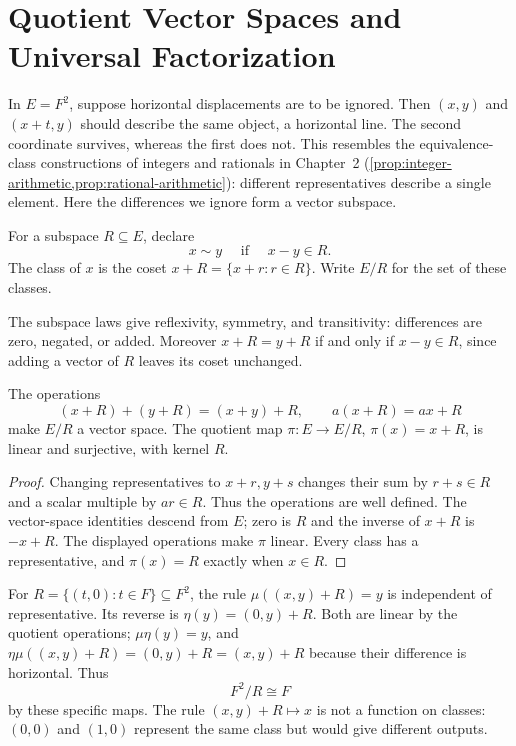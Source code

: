 \section{Quotient Vector Spaces and Universal Factorization}
\label{sec:quotient-vector-spaces}
In $E=F^2$, suppose horizontal displacements are to be ignored. Then
$(x,y)$ and $(x+t,y)$ should describe the same object, a horizontal line.
The second coordinate survives, whereas the first does not. This resembles
the equivalence-class constructions of integers and rationals in Chapter~2 (\cref{prop:integer-arithmetic,prop:rational-arithmetic}):
different representatives describe a single element. Here the differences
we ignore form a vector subspace.
\begin{definition}[Cosets]
For a subspace $R\subseteq E$, declare
\[
x\sim y\quad\text{ if }\quad x-y\in R.
\]
The class of $x$ is the coset $x+R=\{x+r:r\in R\}$. Write $E/R$ for
the set of these classes.
\end{definition}
The subspace laws give reflexivity, symmetry, and transitivity: differences
are zero, negated, or added. Moreover $x+R=y+R$ if and only if $x-y\in R$,
since adding a vector of $R$ leaves its coset unchanged.
\begin{theorem}\label{thm:quotient-space}
The operations
\[
(x+R)+(y+R)=(x+y)+R,\qquad a(x+R)=ax+R
\]
make $E/R$ a vector space. The quotient map $\pi:E\to E/R$, $\pi(x)=x+R$,
is linear and surjective, with kernel $R$.
\end{theorem}
\begin{proof}
Changing representatives to $x+r,y+s$ changes their sum by $r+s\in R$
and a scalar multiple by $ar\in R$. Thus the operations are well defined.
The vector-space identities descend from $E$; zero is $R$ and the inverse
of $x+R$ is $-x+R$. The displayed operations make $\pi$ linear. Every class
has a representative, and $\pi(x)=R$ exactly when $x\in R$.
\end{proof}

\begin{example}
For $R=\{(t,0):t\in F\}\subseteq F^2$, the rule
$\mu((x,y)+R)=y$ is independent of representative. Its reverse is
$\eta(y)=(0,y)+R$. Both are linear by the quotient operations;
$\mu\eta(y)=y$, and $\eta\mu((x,y)+R)=(0,y)+R=(x,y)+R$ because their
difference is horizontal. Thus
\[
F^2/R\cong F
\]
 by these specific maps.
The rule $(x,y)+R\mapsto x$ is not a function on classes: $(0,0)$ and
$(1,0)$ represent the same class but would give different outputs.
\end{example}

